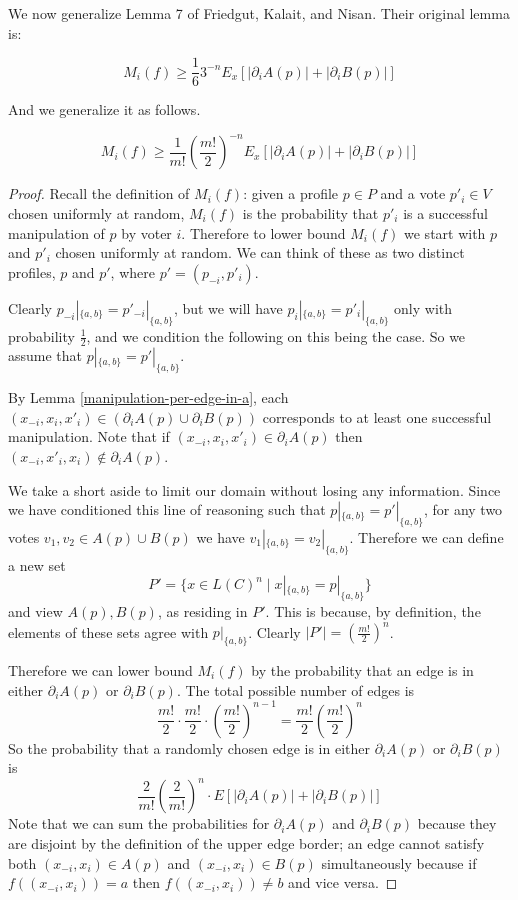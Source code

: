 	We now generalize Lemma 7 of Friedgut, Kalait, and Nisan. Their original lemma is:

	\begin{lemma}
		\[
			M_i(f) \ge \frac{1}{6} 3^{-n} E_x \left[|\partial_i A(p)| + |\partial_i B(p)| \right]
		\]
	\end{lemma}

	And we generalize it as follows.

	\begin{lemma}
		\label{friedgut-lemma-7}
		\[
			M_i(f) \ge \frac{1}{m!} \left(\frac{m!}{2}\right)^{-n} E_x \left[|\partial_i A(p)| + |\partial_i B(p)| \right]
		\]
	\end{lemma}

	\begin{proof}
		Recall the definition of $M_i(f)$: given a profile $p \in P$ and a vote $p'_i \in V$ chosen uniformly at random, $M_i(f)$ is the probability that $p'_i$ is a successful manipulation of $p$ by voter $i$. Therefore to lower bound $M_i(f)$ we start with $p$ and $p'_i$ chosen uniformly at random. We can think of these as two distinct profiles, $p$ and $p'$, where $p' = (p_{-i}, p'_i)$.

		Clearly $p_{-i}|_{\{a,b\}} = p'_{-i}|_{\{a,b\}}$, but we will have $p_i|_{\{a,b\}} = p'_i|_{\{a,b\}}$ only with probability $\frac{1}{2}$, and we condition the following on this being the case. So we assume that $p|_{\{a,b\}} = p'|_{\{a,b\}}$.

		By Lemma \ref{manipulation-per-edge-in-a}, each $(x_{-i}, x_i, x'_i) \in (\partial_i A(p) \cup \partial_i B(p))$ corresponds to at least one successful manipulation. Note that if $(x_{-i}, x_i, x'_i) \in \partial_i A(p)$ then $(x_{-i}, x'_i, x_i) \notin \partial_i A(p)$.

		We take a short aside to limit our domain without losing any information. Since we have conditioned this line of reasoning such that $p|_{\{a,b\}} = p'|_{\{a,b\}}$, for any two votes $v_1, v_2 \in A(p) \cup B(p)$ we have $v_1|_{\{a,b\}} = v_2|_{\{a,b\}}$. Therefore we can define a new set
		\[
			P' = \{x \in L(C)^n \mid x|_{\{a,b\}} = p|_{\{a,b\}}\}
		\]
		and view $A(p), B(p)$, as residing in $P'$. This is because, by definition, the elements of these sets agree with $p|_{\{a,b\}}$. Clearly $|P'| = (\frac{m!}{2})^n$.

		Therefore we can lower bound $M_i(f)$ by the probability that an edge is in either $\partial_i A(p)$ or $\partial_i B(p)$. The total possible number of edges is
		\[
			\frac{m!}{2} \cdot \frac{m!}{2} \cdot \left(\frac{m!}{2}\right)^{n-1} = \frac{m!}{2}\left(\frac{m!}{2}\right)^{n}
		\]
		So the probability that a randomly chosen edge is in either $\partial_i A(p)$ or $\partial_i B(p)$ is
		\[
			\frac{2}{m!} \left(\frac{2}{m!}\right)^{n} \cdot E \left[ |\partial_i A(p)| + |\partial_i B(p)| \right]
		\]
		Note that we can sum the probabilities for $\partial_i A(p)$ and $\partial_i B(p)$ because they are disjoint by the definition of the upper edge border; an edge cannot satisfy both $(x_{-i}, x_i) \in A(p)$ and $(x_{-i}, x_i) \in B(p)$ simultaneously because if $f((x_{-i}, x_i)) = a$ then $f((x_{-i}, x_i)) \ne b$ and vice versa.


\end{proof}
